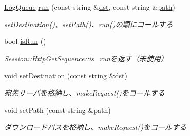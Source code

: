 \begin{DoxyCompactItemize}
\mbox{\hyperlink{class_log_queue}{Log\+Queue}} \mbox{\hyperlink{class_session_1_1_http_get_sequence_a965ad56f58d8f766ee0dc190ddda2dd5}{run}} (const string \&\mbox{\hyperlink{class_session_1_1_http_get_sequence_a7d3da13220f1cb852254aedf19cfd356}{dst}}, const string \&\mbox{\hyperlink{class_session_1_1_http_get_sequence_ad9340442fa9af61603ed99d81a601a96}{path}})
\begin{DoxyCompactList}\small\item\em \mbox{\hyperlink{class_session_1_1_http_get_sequence_a7cba3115e60210a60413dd47d87ea767}{set\+Destination()}}、set\+Path()、run()の順にコールする \end{DoxyCompactList}\item 
\mbox{\label{class_session_1_1_http_get_sequence_a120d1662da3c177b1a2351b3bbf9192b}} 
bool \mbox{\hyperlink{class_session_1_1_http_get_sequence_a120d1662da3c177b1a2351b3bbf9192b}{is\+Run}} ()
\begin{DoxyCompactList}\small\item\em Session\+::\+Http\+Get\+Sequence\+::is\+\_\+runを返す（未使用） \end{DoxyCompactList}\item 
\mbox{\label{class_session_1_1_http_get_sequence_a7cba3115e60210a60413dd47d87ea767}} 
void \mbox{\hyperlink{class_session_1_1_http_get_sequence_a7cba3115e60210a60413dd47d87ea767}{set\+Destination}} (const string \&\mbox{\hyperlink{class_session_1_1_http_get_sequence_a7d3da13220f1cb852254aedf19cfd356}{dst}})
\begin{DoxyCompactList}\small\item\em 宛先サーバを格納し、make\+Request()をコールする \end{DoxyCompactList}\item 
\mbox{\label{class_session_1_1_http_get_sequence_a4afb2f4e6454d8b3d2a59444e192a948}} 
void \mbox{\hyperlink{class_session_1_1_http_get_sequence_a4afb2f4e6454d8b3d2a59444e192a948}{set\+Path}} (const string \&\mbox{\hyperlink{class_session_1_1_http_get_sequence_ad9340442fa9af61603ed99d81a601a96}{path}})
\begin{DoxyCompactList}\small\item\em ダウンロードパスを格納し、make\+Request()をコールする \end{DoxyCompactList}\end{DoxyCompactItemize}
